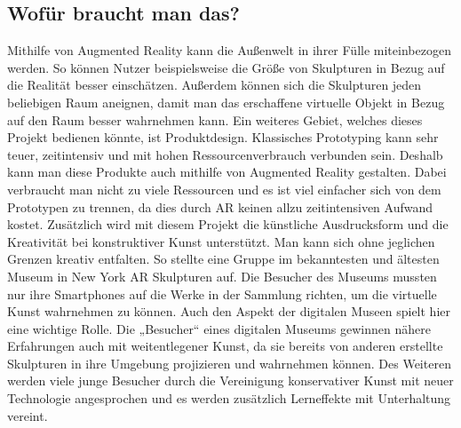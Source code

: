\documentclass[12pt,a4paper, oneside]{scrartcl}
\begin{document}
	
	
	
\subsection{Wofür braucht man das?}	
	
Mithilfe von Augmented Reality kann die Außenwelt in ihrer Fülle miteinbezogen werden.
So können Nutzer beispielsweise die Größe von Skulpturen in Bezug auf die Realität besser einschätzen. Außerdem können sich die Skulpturen jeden beliebigen Raum aneignen, damit man das erschaffene virtuelle Objekt in Bezug auf den Raum besser wahrnehmen kann.
Ein weiteres Gebiet, welches dieses Projekt bedienen könnte, ist Produktdesign. Klassisches Prototyping kann sehr teuer, zeitintensiv und mit hohen Ressourcenverbrauch verbunden sein. Deshalb kann man diese Produkte auch mithilfe von Augmented Reality gestalten. Dabei verbraucht man nicht zu viele Ressourcen und es ist viel einfacher sich von dem Prototypen zu trennen, da dies durch AR keinen allzu zeitintensiven Aufwand kostet.
Zusätzlich wird mit diesem Projekt die künstliche Ausdrucksform und die Kreativität bei konstruktiver Kunst unterstützt. Man kann sich ohne jeglichen Grenzen kreativ entfalten. So stellte eine Gruppe im bekanntesten und ältesten Museum in New York AR Skulpturen auf. Die Besucher des Museums mussten nur ihre Smartphones auf die Werke in der Sammlung richten, um die virtuelle Kunst wahrnehmen zu können.
Auch den Aspekt der digitalen Museen spielt hier eine wichtige Rolle. Die „Besucher“ eines digitalen Museums gewinnen nähere Erfahrungen auch mit weitentlegener Kunst, da sie bereits von anderen erstellte Skulpturen in ihre Umgebung projizieren und wahrnehmen können. Des Weiteren werden viele junge Besucher durch die Vereinigung konservativer Kunst mit neuer Technologie angesprochen und es werden zusätzlich Lerneffekte mit Unterhaltung vereint.






\newpage



\end{document}
